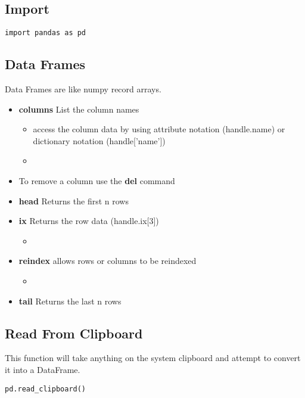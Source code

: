 \subsection{Import}
\begin{lstlisting}
import pandas as pd
\end{lstlisting}

\subsection{Data Frames}
Data Frames are like numpy record arrays.
\begin{itemize}
  \item \textbf{columns} List the column names
    \begin{itemize}
      \item access the column data by using attribute notation (handle.name) or
        dictionary notation (handle['name'])
      \item \color{red}{If the column name is more than one word you must use
        the dictionary notation}
    \end{itemize}
  \item To remove a column use the \textbf{del} command
  \item \textbf{head} Returns the first n rows
  \item \textbf{ix} Returns the row data (handle.ix[3])
    \begin{itemize}
      \item \color{red}{if additional rows and columns are added using this
        command it will have the same effect as calling reindex.}
    \end{itemize}
  \item \textbf{reindex} allows rows or columns to be reindexed
    \begin{itemize}
      \item \color{red}{if no arguments are passed the rows will be reindexed,
        and if the columns argument is passed the columns will be reindexed.}
    \end{itemize}
  \item \textbf{tail} Returns the last n rows
\end{itemize}

\subsection{Read From Clipboard}
This function will take anything on the system clipboard and attempt to convert
it into a DataFrame.
\begin{lstlisting}
pd.read_clipboard()
\end{lstlisting}

